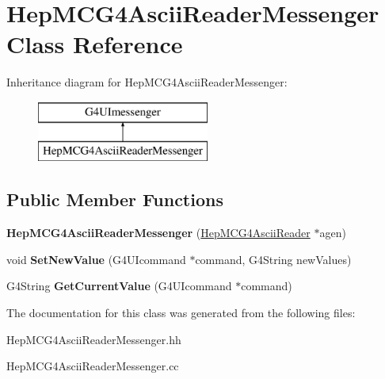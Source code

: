 \hypertarget{class_hep_m_c_g4_ascii_reader_messenger}{}\section{Hep\+M\+C\+G4\+Ascii\+Reader\+Messenger Class Reference}
\label{class_hep_m_c_g4_ascii_reader_messenger}
Inheritance diagram for Hep\+M\+C\+G4\+Ascii\+Reader\+Messenger\+:\begin{figure}[H]
\begin{center}
\leavevmode
\includegraphics[height=2.000000cm]{class_hep_m_c_g4_ascii_reader_messenger}
\end{center}
\end{figure}
\subsection*{Public Member Functions}
\begin{DoxyCompactItemize}
\item 
\hypertarget{class_hep_m_c_g4_ascii_reader_messenger_ad5d0392af95284f57b95244390c17f35}{}{\bfseries Hep\+M\+C\+G4\+Ascii\+Reader\+Messenger} (\hyperlink{class_hep_m_c_g4_ascii_reader}{Hep\+M\+C\+G4\+Ascii\+Reader} $\ast$agen)\label{class_hep_m_c_g4_ascii_reader_messenger_ad5d0392af95284f57b95244390c17f35}

\item 
\hypertarget{class_hep_m_c_g4_ascii_reader_messenger_ab7cbaf09ff5ed12bb49d8be46467b37c}{}void {\bfseries Set\+New\+Value} (G4\+U\+Icommand $\ast$command, G4\+String new\+Values)\label{class_hep_m_c_g4_ascii_reader_messenger_ab7cbaf09ff5ed12bb49d8be46467b37c}

\item 
\hypertarget{class_hep_m_c_g4_ascii_reader_messenger_ad60e3f13f83fb90656676d3087d30ffd}{}G4\+String {\bfseries Get\+Current\+Value} (G4\+U\+Icommand $\ast$command)\label{class_hep_m_c_g4_ascii_reader_messenger_ad60e3f13f83fb90656676d3087d30ffd}

\end{DoxyCompactItemize}


The documentation for this class was generated from the following files\+:\begin{DoxyCompactItemize}
\item 
Hep\+M\+C\+G4\+Ascii\+Reader\+Messenger.\+hh\item 
Hep\+M\+C\+G4\+Ascii\+Reader\+Messenger.\+cc\end{DoxyCompactItemize}
